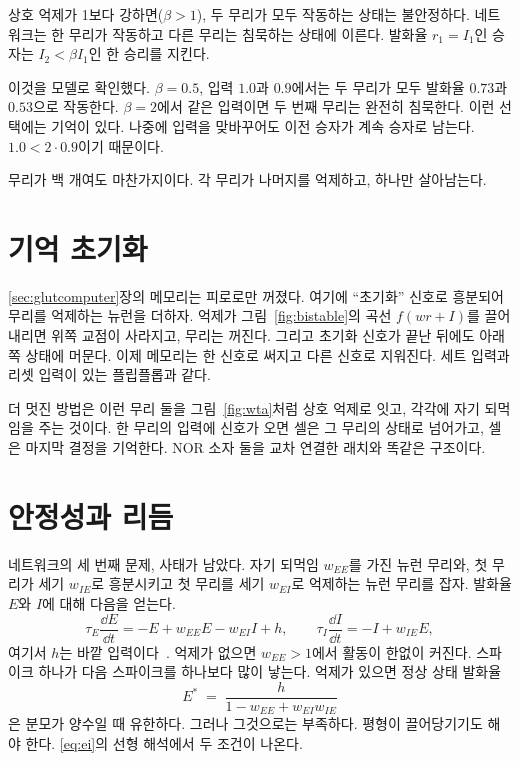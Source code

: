 \begin{keyblock}
\begin{proposition}[승자독식]
\label{prop:wta}
상호 억제가 1보다 강하면($\beta>1$), 두 무리가 모두 작동하는 상태는 불안정하다. 네트워크는 한 무리가 작동하고 다른 무리는 침묵하는 상태에 이른다. 발화율 $r_1=I_1$인 승자는 $I_2<\beta I_1$인 한 승리를 지킨다.
\end{proposition}
\end{keyblock}

이것을 모델로 확인했다. $\beta=0.5$, 입력 $1.0$과 $0.9$에서는 두 무리가 모두 발화율 $0.73$과 $0.53$으로 작동한다. $\beta=2$에서 같은 입력이면 두 번째 무리는 완전히 침묵한다. 이런 선택에는 기억이 있다. 나중에 입력을 맞바꾸어도 이전 승자가 계속 승자로 남는다. $1.0<2\cdot0.9$이기 때문이다.

무리가 백 개여도 마찬가지이다. 각 무리가 나머지를 억제하고, 하나만 살아남는다.

\section{기억 초기화}

\ref{sec:glutcomputer}장의 메모리는 피로로만 꺼졌다. 여기에 “초기화” 신호로 흥분되어 무리를 억제하는  뉴런을 더하자. 억제가 그림~\ref{fig:bistable}의 곡선 $f(wr+I)$를 끌어내리면 위쪽 교점이 사라지고, 무리는 꺼진다. 그리고 초기화 신호가 끝난 뒤에도 아래쪽 상태에 머문다. 이제 메모리는 한 신호로 써지고 다른 신호로 지워진다. 세트 입력과 리셋 입력이 있는 플립플롭과 같다.

더 멋진 방법은 이런 무리 둘을 그림~\ref{fig:wta}처럼 상호 억제로 잇고, 각각에 자기 되먹임을 주는 것이다. 한 무리의 입력에 신호가 오면 셀은 그 무리의 상태로 넘어가고, 셀은 마지막 결정을 기억한다. NOR 소자 둘을 교차 연결한 래치와 똑같은 구조이다.

\section{안정성과 리듬}

 네트워크의 세 번째 문제, 사태가 남았다. 자기 되먹임 $w_{EE}$를 가진  뉴런 무리와, 첫 무리가 세기 $w_{IE}$로 흥분시키고 첫 무리를 세기 $w_{EI}$로 억제하는  뉴런 무리를 잡자. 발화율 $E$와 $I$에 대해 다음을 얻는다.
\begin{equation}
\tau_E\frac{\dd E}{\dd t} = -E + w_{EE}E - w_{EI}I + h, \qquad
\tau_I\frac{\dd I}{\dd t} = -I + w_{IE}E ,
\label{eq:ei}
\end{equation}
여기서 $h$는 바깥 입력이다~\cite{WilsonCowan1972}. 억제가 없으면 $w_{EE}>1$에서 활동이 한없이 커진다. 스파이크 하나가 다음 스파이크를 하나보다 많이 낳는다. 억제가 있으면 정상 상태 발화율
\begin{equation}
E^* \;=\; \frac{h}{1-w_{EE}+w_{EI}w_{IE}}
\label{eq:eistar}
\end{equation}
은 분모가 양수일 때 유한하다. 그러나 그것으로는 부족하다. 평형이 끌어당기기도 해야 한다. \eqref{eq:ei}의 선형 해석에서 두 조건이 나온다.

